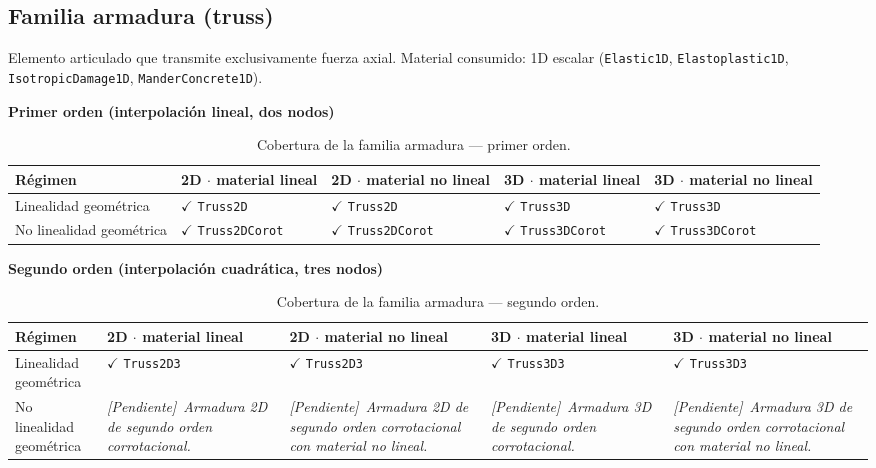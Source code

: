 \documentclass[11pt,oneside]{report}
\newcommand{\pendiente}[1]{\textcolor{pendienteorange}{\textit{[Pendiente]}~\textcolor{pendienteorange}{\textit{#1}}}}
\begin{document}
\subsection{Familia armadura (truss)}

Elemento articulado que transmite exclusivamente fuerza axial. Material consumido: 1D escalar (\texttt{Elastic1D}, \texttt{Elastoplastic1D}, \texttt{IsotropicDamage1D}, \texttt{ManderConcrete1D}).

\textbf{Primer orden (interpolación lineal, dos nodos)}

\begin{table}[h]
\centering
\caption{Cobertura de la familia armadura --- primer orden.}
\begin{tabularx}{\textwidth}{YYYYY}
\hline
\textbf{Régimen} & \textbf{2D \ensuremath{\cdot} material lineal} & \textbf{2D \ensuremath{\cdot} material no lineal} & \textbf{3D \ensuremath{\cdot} material lineal} & \textbf{3D \ensuremath{\cdot} material no lineal} \\
\hline
Linealidad geométrica & \ensuremath{\checkmark} \texttt{Truss2D} & \ensuremath{\checkmark} \texttt{Truss2D} & \ensuremath{\checkmark} \texttt{Truss3D} & \ensuremath{\checkmark} \texttt{Truss3D} \\
No linealidad geométrica & \ensuremath{\checkmark} \texttt{Truss2DCorot} & \ensuremath{\checkmark} \texttt{Truss2DCorot} & \ensuremath{\checkmark} \texttt{Truss3DCorot} & \ensuremath{\checkmark} \texttt{Truss3DCorot} \\
\hline
\end{tabularx}
\end{table}
\textbf{Segundo orden (interpolación cuadrática, tres nodos)}

\begin{table}[h]
\centering
\caption{Cobertura de la familia armadura --- segundo orden.}
\begin{tabularx}{\textwidth}{YYYYY}
\hline
\textbf{Régimen} & \textbf{2D \ensuremath{\cdot} material lineal} & \textbf{2D \ensuremath{\cdot} material no lineal} & \textbf{3D \ensuremath{\cdot} material lineal} & \textbf{3D \ensuremath{\cdot} material no lineal} \\
\hline
Linealidad geométrica & \ensuremath{\checkmark} \texttt{Truss2D3} & \ensuremath{\checkmark} \texttt{Truss2D3} & \ensuremath{\checkmark} \texttt{Truss3D3} & \ensuremath{\checkmark} \texttt{Truss3D3} \\
No linealidad geométrica & \pendiente{Armadura 2D de segundo orden corrotacional.} & \pendiente{Armadura 2D de segundo orden corrotacional con material no lineal.} & \pendiente{Armadura 3D de segundo orden corrotacional.} & \pendiente{Armadura 3D de segundo orden corrotacional con material no lineal.} \\
\hline
\end{tabularx}
\end{table}
\end{document}
